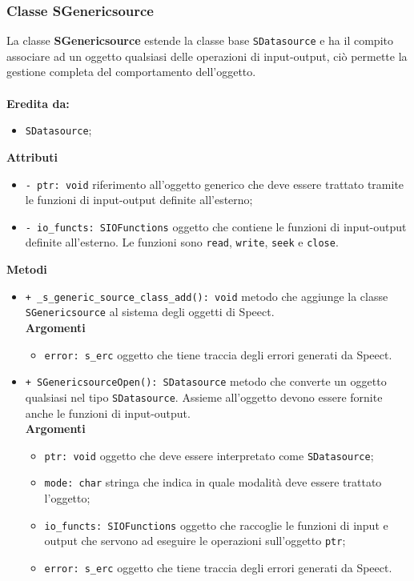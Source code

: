 \subsubsection{Classe SGenericsource}
La classe \textbf{SGenericsource} estende la classe base \texttt{SDatasource} e ha il compito associare ad un oggetto qualsiasi delle operazioni di input-output, ciò permette la gestione completa del comportamento dell'oggetto.\\\\
\textbf{Eredita da:}
\begin{itemize}
	\item \texttt{SDatasource};
\end{itemize}
\textbf{Attributi}
\begin{itemize}
	\item \texttt{- ptr: void} riferimento all'oggetto generico che deve essere trattato tramite le funzioni di input-output definite all'esterno; 
	\item \texttt{- io\_functs: SIOFunctions} oggetto che contiene le funzioni di input-output definite all'esterno. Le funzioni sono \texttt{read}, \texttt{write}, \texttt{seek} e \texttt{close}.  
\end{itemize}
\textbf{Metodi}
\begin{itemize}
	\item \texttt{+ \_s\_generic\_source\_class\_add(): void} metodo che aggiunge la classe \texttt{SGenericsource} al sistema degli oggetti di Speect.\\
	\textbf{Argomenti}
	\begin{itemize}
		\item \texttt{error: s\_erc} oggetto che tiene traccia degli errori generati da Speect.
	\end{itemize}
	\item \texttt{+ SGenericsourceOpen(): SDatasource} metodo che converte un oggetto qualsiasi nel tipo \texttt{SDatasource}. Assieme all'oggetto devono essere fornite anche le funzioni di input-output.\\
	\textbf{Argomenti}
	\begin{itemize}
		\item \texttt{ptr: void} oggetto che deve essere interpretato come \texttt{SDatasource};
		\item \texttt{mode: char} stringa che indica in quale modalità deve essere trattato l'oggetto;
		\item \texttt{io\_functs: SIOFunctions} oggetto che raccoglie le funzioni di input e output che servono ad eseguire le operazioni sull'oggetto \texttt{ptr};
		\item \texttt{error: s\_erc} oggetto che tiene traccia degli errori generati da Speect.
	\end{itemize} 
\end{itemize}


